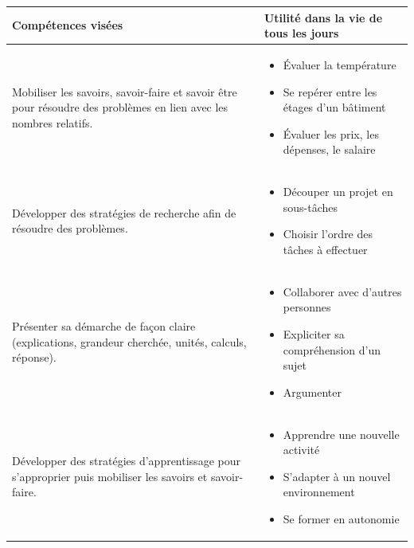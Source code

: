 \def\arraystretch{1.6}
\begin{tabularx}{\textwidth}{|>{\raggedright\arraybackslash}X|>{\raggedright\arraybackslash}X|}
\hline
\cellcolor{themeNO!30}Compétences visées & \cellcolor{themeNO!30}Utilité dans la vie de tous les jours \\
\hline
Mobiliser les savoirs, savoir-faire et savoir être pour résoudre des problèmes en lien avec les nombres relatifs.
&\vspace{-1em}
\begin{itemize}[leftmargin=*, itemsep=2pt, topsep=0pt, partopsep=0pt, parsep=0pt, label=$\triangleright$]
    \item Évaluer la température
    \item Se repérer entre les étages d'un bâtiment
    \item Évaluer les prix, les dépenses, le salaire
\end{itemize} \\
\hline

Développer des stratégies de recherche afin de résoudre des problèmes.
&\vspace{-1em}
\begin{itemize}[leftmargin=*, itemsep=2pt, topsep=0pt, label=$\triangleright$]
    \item Découper un projet en sous-tâches
    \item Choisir l'ordre des tâches à effectuer
\end{itemize} \\
\hline

Présenter sa démarche de façon claire (explications, grandeur cherchée, unités, calculs, réponse).
&\vspace{-1em}
\begin{itemize}[leftmargin=*, itemsep=2pt, topsep=0pt, label=$\triangleright$]
    \item Collaborer avec d'autres personnes
    \item Expliciter sa compréhension d'un sujet
    \item Argumenter
\end{itemize} \\
\hline

Développer des stratégies d'apprentissage pour s'approprier puis mobiliser les savoirs et savoir-faire.
&\vspace{-1em}
\begin{itemize}[leftmargin=*, itemsep=2pt, topsep=0pt, label=$\triangleright$]
    \item Apprendre une nouvelle activité %
    \item S'adapter à un nouvel environnement %
    \item Se former en autonomie %
\end{itemize} \\
\hline


\end{tabularx}
